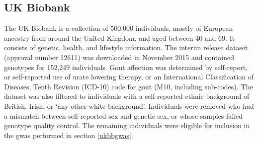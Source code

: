 \documentclass[]{report}
\newenvironment{Shaded}{\begin{snugshade}}{\end{snugshade}}
\newcommand{\KeywordTok}[1]{\textcolor[rgb]{0.13,0.29,0.53}{\textbf{#1}}}
\newcommand{\StringTok}[1]{\textcolor[rgb]{0.31,0.60,0.02}{#1}}
\newcommand{\CommentTok}[1]{\textcolor[rgb]{0.56,0.35,0.01}{\textit{#1}}}
\newcommand{\FunctionTok}[1]{\textcolor[rgb]{0.00,0.00,0.00}{#1}}
\newcommand{\VariableTok}[1]{\textcolor[rgb]{0.00,0.00,0.00}{#1}}
\newcommand{\ExtensionTok}[1]{#1}
\newcommand{\NormalTok}[1]{#1}
\begin{document}
\begin{Shaded}
\end{Shaded}

\subsection{UK Biobank}\label{ukbbdata}

The UK Biobank is a collection of 500,000 individuals, mostly of
European ancestry from around the United Kingdom, and aged between 40
and 69. It consists of genetic, health, and lifestyle information. The
interim release dataset (approval number 12611) was downloaded in
November 2015 and contained genotypes for 152,249 individuals. Gout
affection was determined by self-report, or self-reported use of urate
lowering therapy, or an International Classification of Diseases, Tenth
Revision (ICD-10) code for gout (M10, including sub-codes). The dataset
was also filtered to individuals with a self-reported ethnic background
of British, Irish, or `any other white background'. Individuals were
removed who had a mismatch between self-reported sex and genetic sex, or
whose samples failed genotype quality control. The remaining individuals
were eligible for inclusion in the \gls{gwas} performed in section
\ref{ukbbgwas}.
\end{document}
